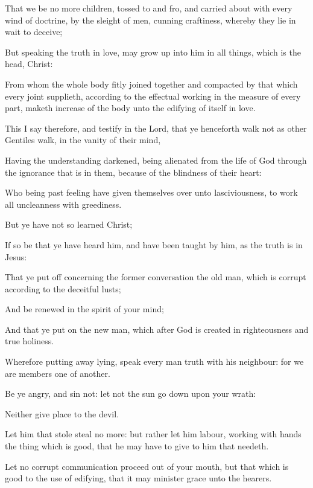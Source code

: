 {That
we
{}
be no
more
children, tossed to and
fro,
and carried
about with
every
wind of
doctrine,
by the
sleight of
men,
{} cunning
craftiness,
whereby
they lie in
wait to
deceive;

But speaking the
truth
in
love, may grow
up
into
him in all
things,
which
is the
head,
{}
Christ:

From
whom the
whole
body fitly joined
together
and
compacted
by that
which
every
joint
supplieth, according
to the effectual
working
in the
measure of
every
part,
maketh
increase of the
body
unto the
edifying of
itself
in
love.


\par }{\PP {}This I
say
therefore,
and
testify
in the
Lord, that
ye
henceforth
walk
not
as
other
Gentiles
walk,
in the
vanity of
their
mind,

Having the
understanding
darkened,
being alienated
from the
life of
God
through the
ignorance that
is
in
them,
because of the
blindness of
their
heart:

Who being past
feeling have
given
themselves
over unto
lasciviousness,
to
work
all
uncleanness
with
greediness.

But
ye
have
not
so
learned
Christ;

If so be
that ye have
heard
him,
and have been
taught
by
him,
as the
truth
is
in
Jesus:

That
ye put
off
concerning the
former
conversation the
old
man, which
is
corrupt according
to the
deceitful
lusts;

And be
renewed in the
spirit of
your
mind;

And that ye put
on the
new
man,
which
after
God is
created
in
righteousness
and
true
holiness.


\par }{\PP {}Wherefore putting
away
lying,
speak every
man
truth
with
his
neighbour:
for we
are
members one of
another.

Be ye
angry,
and
sin
not:
let
not the
sun go
down
upon
your
wrath:

Neither
give
place to the
devil.

Let
him
that
stole
steal no
more:
but
rather let
him
labour,
working
with
{}
hands the thing which
is
good,
that he may
have to
give to him
that
needeth.

Let
no
corrupt
communication
proceed out
of
your
mouth,
but
that which
is
good
to the
use of
edifying,
that it may
minister
grace unto the
hearers.

}
